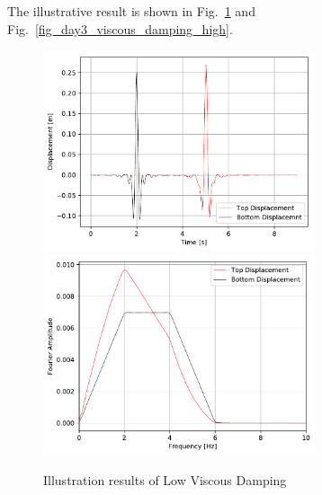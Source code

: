 The illustrative result is shown in Fig.~\ref{fig_day3_viscous_damping} and Fig.~\ref{fig_day3_viscous_damping_high}.

\begin{figure}[H]
  \centering
  \includegraphics[width = 8cm]{./Figure-files/Day3/Viscous_nonlinear_behavior/Rayleigh001Displacement.pdf}
  \includegraphics[width = 8cm]{./Figure-files/Day3/Viscous_nonlinear_behavior/Rayleigh001Displacement_Spectrum.pdf}
  \caption{Illustration results of Low Viscous Damping}
  \label{fig_day3_viscous_damping}
\end{figure}

